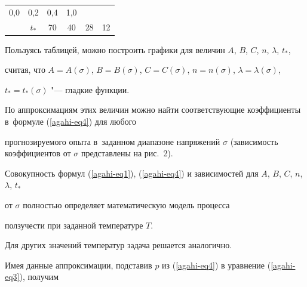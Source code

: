 \begin{table}[h!]
\begin{tabular}{c|c|c|c|c|c}
0,0&

0,2&

0,4&

1,0 \\


 &

$t_\ast $&

70&

40&

28&

12 \\

\hline

\end{tabular}



\end{table}



















Пользуясь таблицей, можно построить графики для величин $A$, $B$, $C$, $n$, $\lambda$, $t_\ast $,

считая, что $A=A(\sigma )$, $B=B(\sigma)$, $C=C(\sigma )$, $n=n(\sigma)$, $\lambda =\lambda (\sigma )$,

$t_\ast=t_\ast (\sigma )$ "---  гладкие функции.

По аппроксимациям этих величин можно найти соответствующие коэффициенты в~формуле (\ref{agahi-eq4}) для любого

прогнозируемого опыта в~заданном диапазоне напряжений $\sigma $ (зависимость коэффициентов от $\sigma$ представлены на рис.~2).

Совокупность формул (\ref{agahi-eq1}), (\ref{agahi-eq4}) и зависимостей для $A$, $B$, $C$, $n$, $\lambda$, $t_\ast $

от $\sigma $ полностью определяет математическую модель процесса

ползучести при заданной температуре $T$.

Для других значений температур задача решается аналогично.





Имея данные аппроксимации, подставив $p$ из (\ref{agahi-eq4}) в уравнение (\ref{agahi-eq3}), получим

